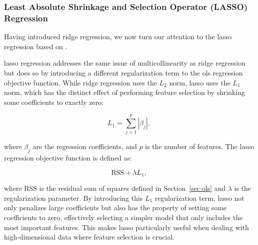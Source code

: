 \subsubsection{Least Absolute Shrinkage and Selection Operator (LASSO) Regression}
Having introduced ridge regression, we now turn our attention to the \gls{lasso} regression based on \citet{James2023AnIS}.

\gls{lasso} regression addresses the same issue of multicollinearity as ridge regression but does so by introducing a different regularization term to the \gls{ols} regression objective function.
While ridge regression uses the $L_2$ norm, \gls{lasso} uses the $L_1$ norm, which has the distinct effect of performing feature selection by shrinking some coefficients to exactly zero:

$$
L_1 = \sum_{j=1}^{p} |\beta_j|,
$$

where $\beta_j$ are the regression coefficients, and $p$ is the number of features.
The \gls{lasso} regression objective function is defined as:

$$
\text{RSS} + \lambda L_1,
$$

where $\text{RSS}$ is the residual sum of squares defined in Section~\ref{sec:ols} and $\lambda$ is the regularization parameter.
By introducing this $L_1$ regularization term, \gls{lasso} not only penalizes large coefficients but also has the property of setting some coefficients to zero, effectively selecting a simpler model that only includes the most important features.
This makes \gls{lasso} particularly useful when dealing with high-dimensional data where feature selection is crucial.